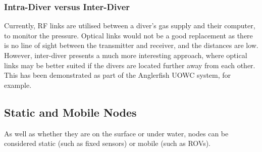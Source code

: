 \subsubsection{Intra-Diver versus Inter-Diver}
Currently, \ac{RF} links are utilised between a diver's gas supply and
their computer, to monitor the pressure. Optical links would not be
a good replacement as there is no line of sight between the transmitter
and receiver, and the distances are low. However, inter-diver presents
a much more interesting approach, where optical links may be better suited
if the divers are located further away from each other. This has been
demonstrated as part of the Anglerfish \ac{UOWC} system, for example.

\subsection{Static and Mobile Nodes}
As well as whether they are on the surface or under water, nodes can be
considered static (such as fixed sensors) or mobile (such as \ac{ROV}s).